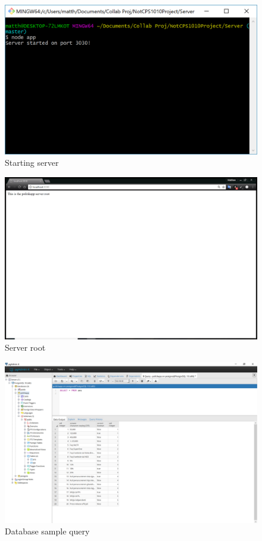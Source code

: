 \documentclass[paper=a4,fontsize=11pt]{article}
\newcommand{\sepspace}{\vspace*{1em}}		%
\begin{document}
\begin{figure}[H]
  \caption{Starting server}
  \hfill\includegraphics[width=12cm]{Walkthrough/Server_Start.PNG}\hspace*{\fill}
  \sepspace
\end{figure}
\begin{figure}[H]
  \caption{Server root}
  \hfill\includegraphics[width=13cm]{Walkthrough/Server_Root.PNG}\hspace*{\fill}
\end{figure}
\begin{figure}[H]
  \caption{Database sample query}
  \hfill\includegraphics[width=13cm]{Walkthrough/DB_sample_query.PNG}\hspace*{\fill}
\end{figure}
\end{document}
